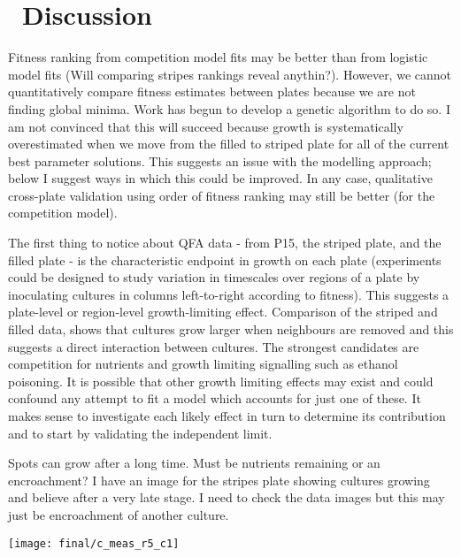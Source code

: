 \graphicspath{{images/}}

\section{\thesection~Discussion}
\label{sec:discussion}

Fitness ranking from competition model fits may be better than from
logistic model fits (Will comparing stripes rankings reveal
anythin?). However, we cannot quantitatively compare fitness estimates
between plates because we are not finding global minima. Work has
begun to develop a genetic algorithm to do so. I am not convinced that
this will succeed because growth is systematically overestimated when
we move from the filled to striped plate for all of the current best
parameter solutions. This suggests an issue with the modelling
approach; below I suggest ways in which this could be improved. In
any case, qualitative cross-plate validation using order of fitness
ranking may still be better (for the competition model).

The first thing to notice about QFA data - from P15, the striped
plate, and the filled plate - is the characteristic endpoint in growth
on each plate (experiments could be designed to study variation in
timescales over regions of a plate by inoculating cultures in columns
left-to-right according to fitness). This suggests a plate-level or
region-level growth-limiting effect.
Comparison of the striped and filled data, shows that cultures grow
larger when neighbours are removed and this suggests a direct
interaction between cultures. The strongest candidates are competition
for nutrients and growth limiting signalling such as ethanol
poisoning. It is possible that other growth limiting effects may exist
and could confound any attempt to fit a model which accounts for just
one of these. It makes sense to investigate each likely effect in turn
to determine its contribution and to start by validating the
independent limit.



Spots can grow after a long time. Must be nutrients remaining or an
encroachment? I have an image for the stripes plate showing cultures
growing and believe after a very late stage. I need to check the data
images but this may just be encroachment of another culture.
\graphicspath{{images/stripes/}}
\begin{Figure}
  \centering
  \texttt{[image: final/c\_meas\_r5\_c1]}
  \label{fig:kn_guessing}
\end{Figure}


